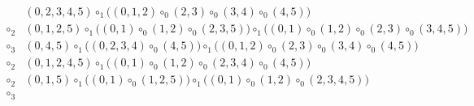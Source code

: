 \begin{align*}
	&(0, 2, 3, 4, 5) \circ_1 \big((0, 1, 2) \circ_0 (2, 3) \circ_0 (3, 4) \circ_0 (4, 5)\big) \\
	\circ_2 &
	(0, 1, 2, 5) \circ_1 \big((0, 1) \circ_0 (1, 2) \circ_0 (2, 3, 5)\big)
	\circ_1
	\big((0, 1) \circ_0 (1, 2) \circ_0 (2, 3) \circ_0 (3, 4, 5)\big) \\
	\circ_3
	&(0, 4, 5) \circ_1 \big((0, 2, 3, 4) \circ_0 (4, 5)\big) \circ_1 \big((0, 1, 2) \circ_0 (2, 3) \circ_0 (3, 4) \circ_0 (4, 5)\big) \\
	\circ_2&
	(0, 1, 2, 4, 5) \circ_1 \big((0, 1) \circ_0 (1, 2) \circ_0 (2, 3, 4) \circ_0 (4, 5)\big) \\
	\circ_2&
	(0, 1, 5) \circ_1 \big((0, 1) \circ_0 (1, 2, 5)\big) \circ_1 \big((0, 1) \circ_0 (1, 2) \circ_0 (2, 3, 4, 5)\big) \\
	\circ_3
\end{align*}